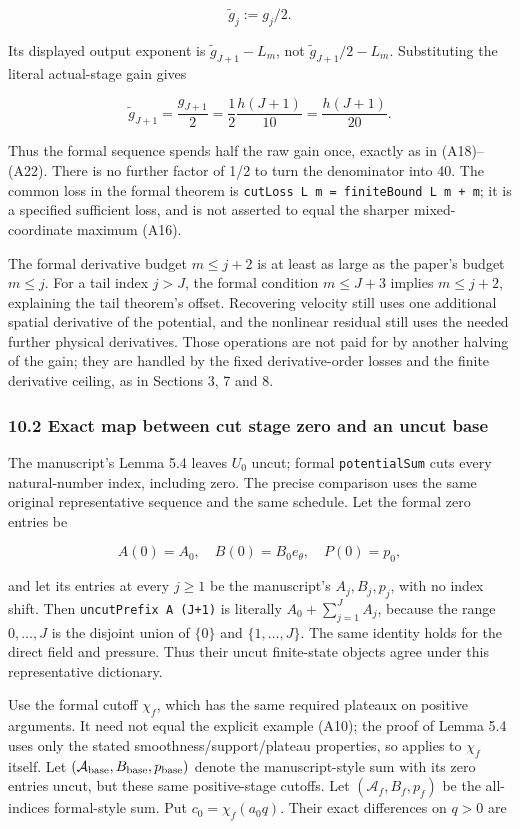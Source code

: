 \documentclass[10pt,a4paper]{article}
\begin{document}
\[
\widetilde g_j:=g_j/2.
\]

Its displayed output exponent is \(\widetilde g_{J+1}-L_m\), not \(\widetilde g_{J+1}/2-L_m\). Substituting the literal actual-stage gain gives

\[
\widetilde g_{J+1}=\frac{g_{J+1}}2
=\frac12\frac{h(J+1)}{10}=\frac{h(J+1)}{20}.
\tag{A44}
\]

Thus the formal sequence spends half the raw gain once, exactly as in (A18)--(A22). There is no further factor of 1/2 to turn the denominator into 40. The common loss in the formal theorem is \texttt{cutLoss\ L\ m\ =\ finiteBound\ L\ m\ +\ m}; it is a specified sufficient loss, and is not asserted to equal the sharper mixed-coordinate maximum (A16).

The formal derivative budget \(m\le j+2\) is at least as large as the paper's budget \(m\le j\). For a tail index \(j>J\), the formal condition \(m\le J+3\) implies \(m\le j+2\), explaining the tail theorem's offset. Recovering velocity still uses one additional spatial derivative of the potential, and the nonlinear residual still uses the needed further physical derivatives. Those operations are not paid for by another halving of the gain; they are handled by the fixed derivative-order losses and the finite derivative ceiling, as in Sections 3, 7 and 8.

\subsubsection{10.2 Exact map between cut stage zero and an uncut base}\label{exact-map-between-cut-stage-zero-and-an-uncut-base}

The manuscript's Lemma 5.4 leaves \(U_0\) uncut; formal \nolinkurl{potentialSum} cuts every natural-number index, including zero. The precise comparison uses the same original representative sequence and the same schedule. Let the formal zero entries be

\[
A(0)=A_0,\quad B(0)=B_0e_\theta,\quad P(0)=p_0,
\]

and let its entries at every \(j\ge1\) be the manuscript's \(A_j,B_j,p_j\), with no index shift. Then \texttt{uncutPrefix\ A\ (J+1)} is literally \(A_0+\sum_{j=1}^JA_j\), because the range \(0,\ldots,J\) is the disjoint union of \(\{0\}\) and \(\{1,\ldots,J\}\). The same identity holds for the direct field and pressure. Thus their uncut finite-state objects agree under this representative dictionary.

Use the formal cutoff \(\chi_f\), which has the same required plateaux on positive arguments. It need not equal the explicit example (A10); the proof of Lemma 5.4 uses only the stated smoothness/support/plateau properties, so applies to \(\chi_f\) itself. Let \((\mathcal A_{\rm base},B_{\rm base},p_{\rm base})\) denote the manuscript-style sum with its zero entries uncut, but these same positive-stage cutoffs. Let \((\mathcal A_f,B_f,p_f)\) be the all-indices formal-style sum. Put \(c_0=\chi_f(a_0q)\). Their exact differences on \(q>0\) are
\end{document}
